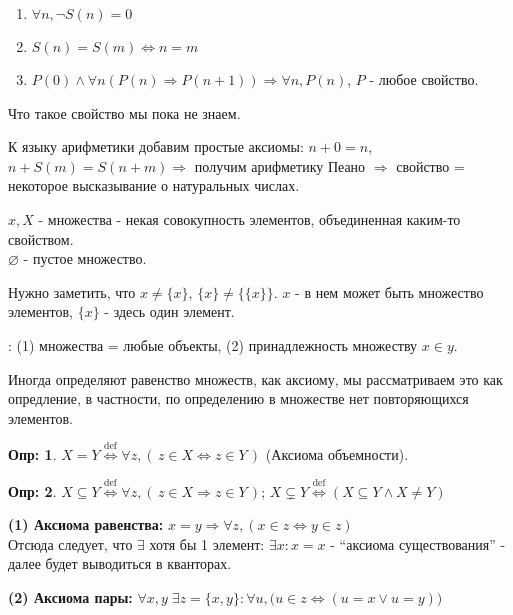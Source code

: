 \documentclass[12pt]{article}
\theoremstyle{definition}
\newtheorem{defn}{Опр:}
\begin{document}
\begin{enumerate}[label={(\arabic*)}]
	\item $\forall n, \neg S(n) = 0$
	\item $S(n) = S(m) \Leftrightarrow n = m$
	\item $P(0) \wedge \forall n (P(n) \Rightarrow P(n+1)) \Rightarrow \forall n, P(n)$, $P$ - любое свойство.
\end{enumerate}

Что такое свойство мы пока не знаем.

К языку арифметики добавим простые аксиомы: $n + 0 = n$, $n + S(m) = S(n+m) \Rightarrow$ получим арифметику Пеано $\Rightarrow$ свойство = некоторое высказывание о натуральных числах.

$x, X$ - множества - некая совокупность элементов, объединенная каким-то свойством. \\
$\varnothing$ - пустое множество. 

Нужно заметить, что $x \neq \{x\}$, $\{x\} \neq \{\{x\}\}$. $x$ - в нем может быть множество элементов, $\{x\}$ - здесь один элемент.

: (1) множества = любые объекты, (2) принадлежность множеству $x \in y$.

Иногда определяют равенство множеств, как аксиому, мы рассматриваем это как опредление, в частности, по определению в множестве нет повторяющихся элементов.


\begin{defn}
	$X = Y \overset{\text{def}}{\Longleftrightarrow} \forall z, (\, z\in X \Leftrightarrow z \in Y \,)$ (Аксиома объемности).
\end{defn}

\begin{defn}
	$X \subseteq Y \overset{\text{def}}{\Longleftrightarrow} \forall z, (\, z\in X \Rightarrow z \in Y \,)$; $X \subsetneq Y \overset{\text{def}}{\Longleftrightarrow} (X \subseteq Y \wedge X \neq Y)$
\end{defn}


\textbf{(1) Аксиома равенства:} $x = y \Rightarrow \forall z,  (x\in z \Leftrightarrow y \in z)$\\
Отсюда следует, что $\exists$ хотя бы 1 элемент: $\exists x\colon x = x$ - ``аксиома существования'' - далее будет выводиться в кванторах.

\textbf{(2) Аксиома пары:} $\forall x, y \; \exists z = \{x,y\} \colon \forall u, \big(u\in z \Leftrightarrow (u = x \vee u = y)\big)$
\end{document}
